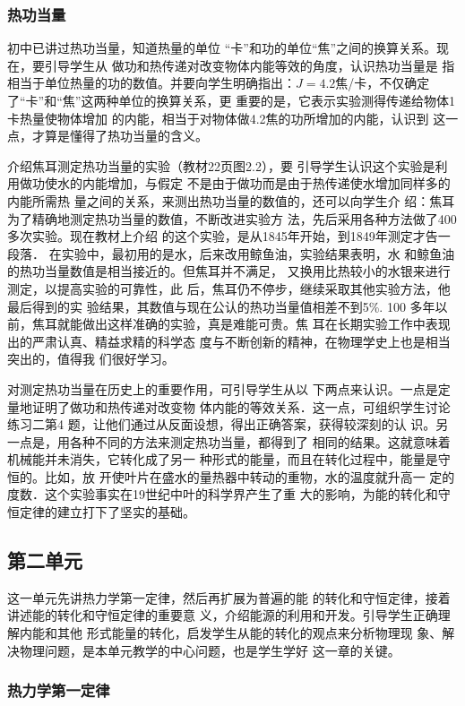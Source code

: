 \subsubsection{热功当量} 初中已讲过热功当量，知道热量的单位
“卡”和功的单位“焦”之间的换算关系。现在，要引导学生从
做功和热传递对改变物体内能等效的角度，认识热功当量是
指相当于单位热量的功的数值。并要向学生明确指出：$J=
4.2$焦/卡，不仅确定了“卡”和“焦”这两种单位的换算关系，更
重要的是，它表示实验测得传递给物体1卡热量使物体增加
的内能，相当于对物体做4.2焦的功所增加的内能，认识到
这一点，才算是懂得了热功当量的含义。

介绍焦耳测定热功当量的实验（教材22页图2.2），要
引导学生认识这个实验是利用做功使水的内能增加，与假定
不是由于做功而是由于热传递使水增加同样多的内能所需热
量之间的关系，来测出热功当量的数值的，还可以向学生介
绍：焦耳为了精确地测定热功当量的数值，不断改进实验方
法，先后采用各种方法做了400多次实验。现在教材上介绍
的这个实验，是从1845年开始，到1849年测定才告一段落．
在实验中，最初用的是水，后来改用鲸鱼油，实验结果表明，水
和鲸鱼油的热功当量数值是相当接近的。但焦耳并不满足，
又换用比热较小的水银来进行测定，以提高实验的可靠性，此
后，焦耳仍不停步，继续采取其他实验方法，他最后得到的实
验结果，其数值与现在公认的热功当量值相差不到5\%. 100
多年以前，焦耳就能做出这样准确的实验，真是难能可贵。焦
耳在长期实验工作中表现出的严肃认真、精益求精的科学态
度与不断创新的精神，在物理学史上也是相当突出的，值得我
们很好学习。

对测定热功当量在历史上的重要作用，可引导学生从以
下两点来认识。一点是定量地证明了做功和热传递对改变物
体内能的等效关系．这一点，可组织学生讨论练习二第4
题，让他们通过从反面设想，得出正确答案，获得较深刻的认
识。另一点是，用各种不同的方法来测定热功当量，都得到了
相同的结果。这就意味着机械能并未消失，它转化成了另一
种形式的能量，而且在转化过程中，能量是守恒的。比如，放
开使叶片在盛水的量热器中转动的重物，水的温度就升高一
定的度数．这个实验事实在19世纪中叶的科学界产生了重
大的影响，为能的转化和守恒定律的建立打下了坚实的基础。

\subsection{第二单元}
这一单元先讲热力学第一定律，然后再扩展为普遍的能
的转化和守恒定律，接着讲述能的转化和守恒定律的重要意
义，介绍能源的利用和开发。引导学生正确理解内能和其他
形式能量的转化，启发学生从能的转化的观点来分析物理现
象、解决物理问题，是本单元教学的中心问题，也是学生学好
这一章的关键。

\subsubsection{热力学第一定律}

